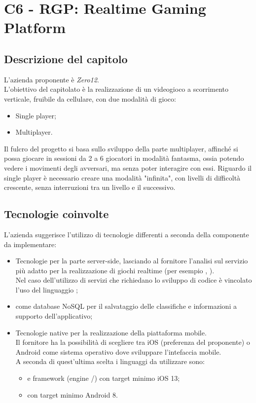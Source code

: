 \section{C6 - RGP: Realtime Gaming Platform}

\subsection{Descrizione del capitolo}
L'azienda proponente è \textit{Zero12}. \\ 
L'obiettivo del capitolato è la realizzazione di un videogioco a scorrimento verticale, fruibile da cellulare, con due modalità di gioco:
\begin{itemize}
\item Single player;
\item Multiplayer.
\end{itemize}  
Il fulcro del progetto si basa sullo sviluppo della parte multiplayer, affinché si possa giocare in sessioni da 2 a 6 giocatori in modalità fantasma, ossia potendo vedere i movimenti degli avversari, ma senza poter interagire con essi.
Riguardo il single player è necessario creare una modalità "infinita", con livelli di difficoltà crescente, senza interruzioni tra un livello e il successivo.

\subsection{Tecnologie coinvolte}
L'azienda suggerisce l'utilizzo di tecnologie differenti a seconda della componente da implementare:
\begin{itemize}
\item Tecnologie  per la parte server-side, lasciando al fornitore l'analisi sul servizio più adatto per la realizzazione di giochi realtime (per esempio , ). \\
Nel caso dell'utilizzo di servizi che richiedano lo sviluppo di codice è vincolato l'uso del linguaggio ;
\item {} come database NoSQL per il salvataggio delle classifiche e informazioni a supporto dell'applicativo; 
\item Tecnologie native per la realizzazione della piattaforma mobile. \\ 
Il fornitore ha la possibilità di scegliere tra iOS (preferenza del proponente) o Android come sistema operativo dove sviluppare l'intefaccia mobile. \\
A seconda di quest'ultima scelta i linguaggi da utilizzare sono:
\begin{itemize}
\item {} e framework  (engine /) con target minimo iOS 13;
\item {} con target minimo Android 8.
\end{itemize}
\end{itemize}

